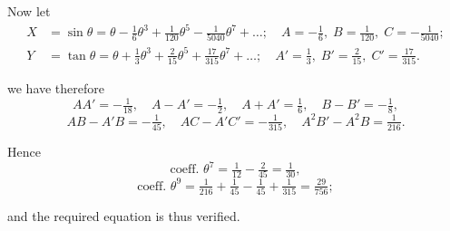 \documentclass[11pt]{article}
\begin{document}
Now let
\begin{align*}
X &= \sin\theta = \theta - \tfrac{1}{6}\theta^{3} + \tfrac{1}{120}\theta^{5} - \tfrac{1}{5040}\theta^{7} + \ldots; \quad A = -\tfrac{1}{6},\; B = \tfrac{1}{120},\; C = -\tfrac{1}{5040}; \\
Y &= \tan\theta = \theta + \tfrac{1}{3}\theta^{3} + \tfrac{2}{15}\theta^{5} + \tfrac{17}{315}\theta^{7} + \ldots; \quad A' = \tfrac{1}{3},\; B' = \tfrac{2}{15},\; C' = \tfrac{17}{315}.
\end{align*}

we have therefore
\[
AA' = -\tfrac{1}{18}, \quad A - A' = -\tfrac{1}{2}, \quad A + A' = \tfrac{1}{6}, \quad B - B' = -\tfrac{1}{8},
\]
\[
AB - A'B = -\tfrac{1}{45}, \quad AC - A'C' = -\tfrac{1}{315}, \quad A^{2}B' - A^{2}B = \tfrac{1}{216}.
\]

Hence
\[
\text{coeff. } \theta^{7} = \tfrac{1}{12} - \tfrac{2}{45} = \tfrac{1}{30},
\]
\[
\text{coeff. } \theta^{9} = \tfrac{1}{216} + \tfrac{1}{45} - \tfrac{1}{45} + \tfrac{1}{315} = \tfrac{29}{756};
\]

and the required equation is thus verified.
\end{document}
